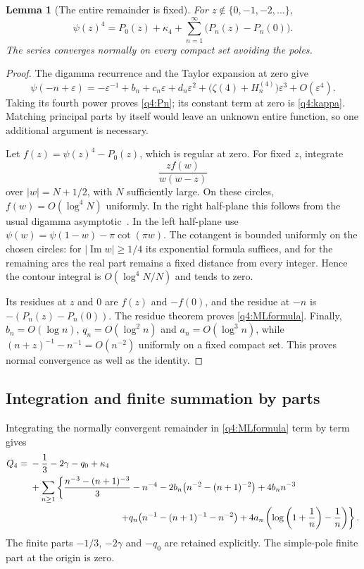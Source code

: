 \documentclass[11pt,a4paper]{article}
\numberwithin{equation}{section}
\newtheorem{lemma}[theorem]{Lemma}
\theoremstyle{definition}
\theoremstyle{remark}
\begin{document}
\begin{lemma}[The entire remainder is fixed]\label{q4:ML}
For $z\notin\{0,-1,-2,\ldots\}$,
\begin{equation}\label{q4:MLformula}
 \psi(z)^4=P_0(z)+\kappa_4+
                   \sum_{n=1}^{\infty}\bigl(P_n(z)-P_n(0)\bigr).
\end{equation}
The series converges normally on every compact set avoiding the poles.
\end{lemma}

\begin{proof}
The digamma recurrence and the Taylor expansion at zero
\cite[Sections~5.5, 5.7]{DLMF} give
\[
 \psi(-n+\varepsilon)=-\varepsilon^{-1}+b_n+c_n\varepsilon
           +d_n\varepsilon^2
           +\bigl(\zeta(4)+H_n^{(4)}\bigr)\varepsilon^3
           +O(\varepsilon^4).
\]
Taking its fourth power proves \eqref{q4:Pn}; its constant term at zero
is \eqref{q4:kappa}.  Matching principal parts by itself would leave an
unknown entire function, so one additional argument is necessary.

Let $f(z)=\psi(z)^4-P_0(z)$, which is regular at zero.  For fixed $z$,
integrate
\[
 \frac{z f(w)}{w(w-z)}
\]
over $|w|=N+1/2$, with $N$ sufficiently large.  On these circles,
$f(w)=O(\log^4N)$ uniformly.  In the right half-plane this follows from
the usual digamma asymptotic~\cite[Section~5.11]{DLMF}.
In the left half-plane use
$\psi(w)=\psi(1-w)-\pi\cot(\pi w)$.  The cotangent is bounded uniformly
on the chosen circles: for $|\operatorname{Im}w|\geq1/4$ its exponential
formula suffices, and for the remaining arcs the real part remains a
fixed distance from every integer.  Hence the contour integral is
$O(\log^4N/N)$ and tends to zero.

Its residues at $z$ and $0$ are $f(z)$ and $-f(0)$, and the residue at
$-n$ is $-(P_n(z)-P_n(0))$.  The residue theorem proves
\eqref{q4:MLformula}.  Finally,
$b_n=O(\log n)$, $q_n=O(\log^2n)$ and $a_n=O(\log^3n)$, while
$(n+z)^{-1}-n^{-1}=O(n^{-2})$ uniformly on a fixed compact set.
This proves normal convergence as well as the identity.
\end{proof}

\subsection{Integration and finite summation by parts}

Integrating the normally convergent remainder in \eqref{q4:MLformula}
term by term gives
\begin{align}\label{q4:integrated}
 Q_4={}&-\frac13-2\gamma-q_0+\kappa_4\notag\\
 &+\sum_{n\geq1}\left\{
   \frac{n^{-3}-(n+1)^{-3}}3-n^{-4}
   -2b_n\bigl(n^{-2}-(n+1)^{-2}\bigr)+4b_nn^{-3}\right.\notag\\
 &\hspace{34mm}\left.
   +q_n\bigl(n^{-1}-(n+1)^{-1}-n^{-2}\bigr)
   +4a_n\left(\log\left(1+\frac1n\right)-\frac1n\right)
  \right\}.
\end{align}
The finite parts $-1/3$, $-2\gamma$ and $-q_0$ are retained explicitly.
The simple-pole finite part at the origin is zero.
\end{document}
